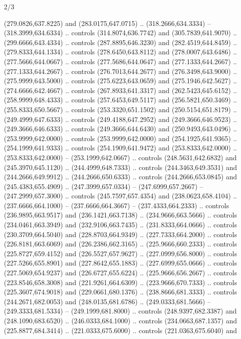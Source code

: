 \begin{flagdescription}{2/3}
\begin{scope}[xshift=0.5\flaglength,yshift=0.5\flagwidth,scale=\flagwidth/525.28]
\begin{scope}[y=0.1mm, x=0.1mm, yscale=-1,shift={(-381.5,-404)}]
\begin{scope}[shift={(5.25001,4.53053)},miter limit=4.00,line width=0.800\lw]
  (279.0826,637.8225) and (283.0175,647.0715) .. (318.2666,634.3334) --
  (318.3999,634.6334) .. controls (314.8074,636.7742) and (305.7839,641.9070) ..
  (299.6666,643.4334) .. controls (287.8895,646.3230) and (282.4519,644.8459) ..
  (279.8333,644.1334) .. controls (278.6450,643.8112) and (278.0007,643.6486) ..
  (277.5666,644.0667) .. controls (277.5686,644.0647) and (277.1333,644.2667) ..
  (277.1333,644.2667) .. controls (276.7013,644.2677) and (276.3498,643.9000) ..
  (275.9999,643.5000) .. controls (275.6223,643.0659) and (275.1946,642.5627) ..
  (274.6666,642.4667) .. controls (267.8933,641.3317) and (262.5423,645.6152) ..
  (258.9999,648.4333) .. controls (257.6453,649.5117) and (256.5821,650.3469) ..
  (255.8333,650.5667) .. controls (253.3320,651.1502) and (250.5154,651.8179) ..
  (249.4999,647.6333) .. controls (249.4188,647.2952) and (249.3666,646.9523) ..
  (249.3666,646.6333) .. controls (249.3666,644.6430) and (250.9493,643.0496) ..
  (253.9999,642.0000) .. controls (253.9999,642.0000) and (254.1925,641.9365) ..
  (254.1999,641.9333) .. controls (254.1909,641.9472) and (253.8333,642.0000) ..
  (253.8333,642.0000) -- (253.1999,642.0667) .. controls (248.5631,642.6832) and
  (245.3970,645.1120) .. (244.4999,648.7333) .. controls (244.3463,649.3531) and
  (244.2666,649.9912) .. (244.2666,650.6333) .. controls (244.2666,653.0845) and
  (245.4383,655.4909) .. (247.3999,657.0334) -- (247.6999,657.2667) --
  (247.2999,657.3000) .. controls (245.7597,657.4354) and (238.0623,658.4104) ..
  (237.6666,664.1000) -- (237.6666,664.3667) -- (237.4333,664.2333) .. controls
  (236.9895,663.9517) and (236.1421,663.7138) .. (234.9666,663.5666) .. controls
  (234.0461,663.3949) and (232.9106,663.7435) .. (231.8333,664.0666) .. controls
  (230.3709,664.5040) and (228.8703,664.9349) .. (227.7333,664.2000) .. controls
  (226.8181,663.6069) and (226.2386,662.3165) .. (225.9666,660.2333) .. controls
  (225.8727,659.4152) and (226.5527,657.9627) .. (227.0999,656.8000) .. controls
  (227.5266,655.8901) and (227.8642,655.1883) .. (227.6999,655.0666) .. controls
  (227.5069,654.9237) and (226.6727,655.6224) .. (225.9666,656.2667) .. controls
  (223.8546,658.3008) and (221.9261,664.6309) .. (223.9666,670.7333) .. controls
  (225.3607,674.9018) and (229.0661,680.1376) .. (238.8666,681.3333) .. controls
  (244.2671,682.0053) and (248.0135,681.6786) .. (249.0333,681.5666) --
  (249.3333,681.5334) -- (249.1999,681.8000) .. controls (248.9397,682.3387) and
  (248.1090,683.6520) .. (246.0333,684.1000) .. controls (234.0663,687.1357) and
  (225.8877,684.3414) .. (221.0333,675.6000) .. controls (221.0363,675.6040) and

\end{scope}
\end{scope}
\end{scope}
\end{flagdescription}
